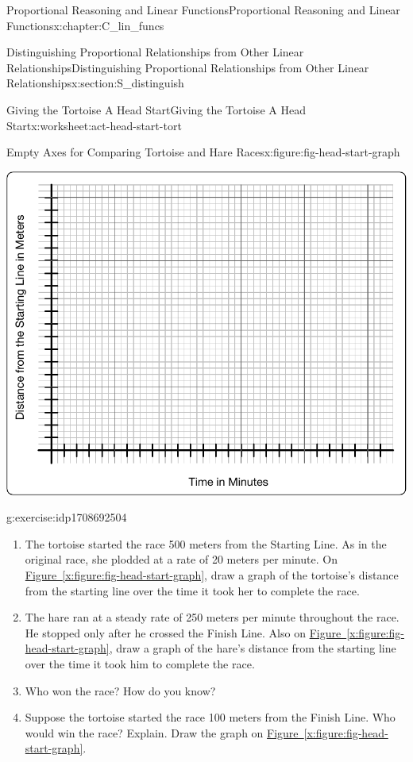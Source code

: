 \documentclass[oneside,10pt,]{book}
\newcommand{\xreffont}{\relax}
\numberwithin{equation}{chapter}
\begin{document}
\begin{chapterptx}{Proportional Reasoning and Linear Functions}{}{Proportional Reasoning and Linear Functions}{}{}{x:chapter:C_lin_funcs}
\begin{sectionptx}{Distinguishing Proportional Relationships from Other Linear Relationships}{}{Distinguishing Proportional Relationships from Other Linear Relationships}{}{}{x:section:S_distinguish}
\begin{worksheet-subsection}{Giving the Tortoise A Head Start}{}{Giving the Tortoise A Head Start}{}{}{x:worksheet:act-head-start-tort}
\begin{introduction}{}
\begin{figureptx}{Empty Axes for Comparing Tortoise and Hare Races}{x:figure:fig-head-start-graph}{}
\begin{image}{0.1}{0.8}{0.1}
\includegraphics[width=\linewidth]{external/head-start-graph.pdf}
\end{image}%
\tcblower
\end{figureptx}%
\end{introduction}%
\begin{divisionexercise}{1}{}{}{g:exercise:idp1708692504}%
\begin{enumerate}[font=\bfseries,label=(\alph*),ref=\alph*]
\item\label{x:task:exer-tort-fhund}The tortoise started the race 500 meters from the Starting Line. As in the original race, she plodded at a rate of 20 meters per minute. On \hyperref[x:figure:fig-head-start-graph]{Figure~{\xreffont\ref{x:figure:fig-head-start-graph}}}, draw a graph of the tortoise's distance from the starting line over the time it took her to complete the race.%
\item{}The hare ran at a steady rate of 250 meters per minute throughout the race. He stopped only after he crossed the Finish Line. Also on \hyperref[x:figure:fig-head-start-graph]{Figure~{\xreffont\ref{x:figure:fig-head-start-graph}}}, draw a graph of the hare's distance from the starting line over the time it took him to complete the race.%
\item{}Who won the race? How do you know?%
\item\label{x:task:exer-tort-ohund}Suppose the tortoise started the race 100 meters from the Finish Line. Who would win the race? Explain. Draw the graph on \hyperref[x:figure:fig-head-start-graph]{Figure~{\xreffont\ref{x:figure:fig-head-start-graph}}}.%

\end{enumerate}
\end{divisionexercise}
\end{worksheet-subsection}
\end{sectionptx}
\end{chapterptx}
\end{document}
